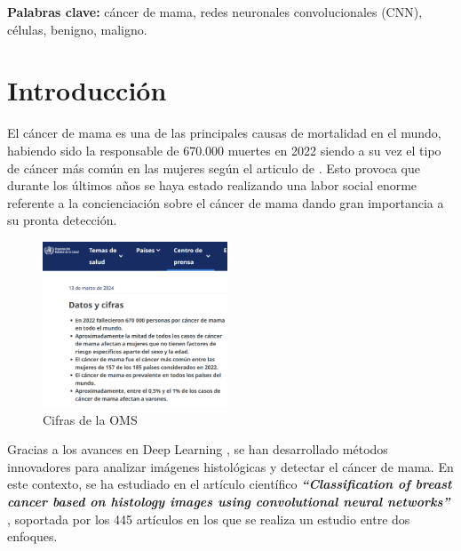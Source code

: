 \documentclass[12pt]{article} %
\begin{document}
\vspace{.5cm}

\textbf{Palabras clave:} cáncer de mama, redes neuronales convolucionales (CNN), células, benigno, maligno.

\newpage
\tableofcontents

\newpage

\section{Introducción}
El cáncer de mama es una de las principales causas de mortalidad en el mundo, habiendo sido la responsable de 670.000 muertes en 2022 siendo a su vez el tipo de cáncer más común en las mujeres según el articulo de \cite{who_breast_cancer}. Esto provoca que durante los últimos años se haya estado realizando una labor social enorme referente a la concienciación sobre el cáncer de mama dando gran importancia a su pronta detección.\\

\begin{figure}[!ht]
    \centering
    \includegraphics[width=0.49\textwidth]{introduccion.png}
    \caption{Cifras de la OMS \cite{who_breast_cancer}}
    \label{fig:OMS}
\end{figure}

Gracias a los avances en Deep Learning \cite{shinde2018review}, se han desarrollado métodos innovadores para analizar imágenes histológicas y detectar el cáncer de mama. En este contexto, se ha estudiado en el artículo científico \textit{\textbf{“Classification of breast cancer based on histology images using convolutional neural networks”}} \cite{bardou2018classification}, soportada por los 445 artículos en los que se realiza un estudio entre dos enfoques.\\
\end{document}
